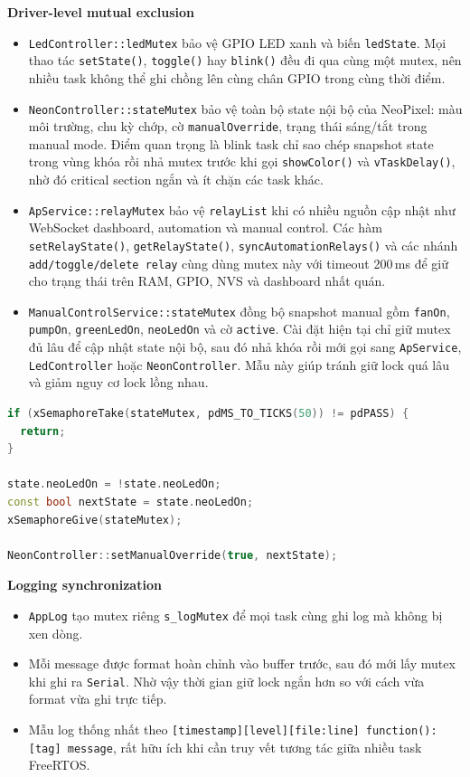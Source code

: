 \textbf{Driver-level mutual exclusion}
\begin{itemize}
    \item \texttt{LedController::ledMutex} bảo vệ GPIO LED xanh và biến \texttt{ledState}. Mọi thao tác \texttt{setState()}, \texttt{toggle()} hay \texttt{blink()} đều đi qua cùng một mutex, nên nhiều task không thể ghi chồng lên cùng chân GPIO trong cùng thời điểm.
    \item \texttt{NeonController::stateMutex} bảo vệ toàn bộ state nội bộ của NeoPixel: màu môi trường, chu kỳ chớp, cờ \texttt{manualOverride}, trạng thái sáng/tắt trong manual mode. Điểm quan trọng là blink task chỉ sao chép snapshot state trong vùng khóa rồi nhả mutex trước khi gọi \texttt{showColor()} và \texttt{vTaskDelay()}, nhờ đó critical section ngắn và ít chặn các task khác.
    \item \texttt{ApService::relayMutex} bảo vệ \texttt{relayList} khi có nhiều nguồn cập nhật như WebSocket dashboard, automation và manual control. Các hàm \texttt{setRelayState()}, \texttt{getRelayState()}, \texttt{syncAutomationRelays()} và các nhánh \texttt{add/toggle/delete relay} cùng dùng mutex này với timeout 200\,ms để giữ cho trạng thái trên RAM, GPIO, NVS và dashboard nhất quán.
    \item \texttt{ManualControlService::stateMutex} đồng bộ snapshot manual gồm \texttt{fanOn}, \texttt{pumpOn}, \texttt{greenLedOn}, \texttt{neoLedOn} và cờ \texttt{active}. Cài đặt hiện tại chỉ giữ mutex đủ lâu để cập nhật state nội bộ, sau đó nhả khóa rồi mới gọi sang \texttt{ApService}, \texttt{LedController} hoặc \texttt{NeonController}. Mẫu này giúp tránh giữ lock quá lâu và giảm nguy cơ lock lồng nhau.
\end{itemize}

\begin{lstlisting}[language=C++,caption={Mau cap nhat state ngan gon roi moi goi driver}]
if (xSemaphoreTake(stateMutex, pdMS_TO_TICKS(50)) != pdPASS) {
  return;
}

state.neoLedOn = !state.neoLedOn;
const bool nextState = state.neoLedOn;
xSemaphoreGive(stateMutex);

NeonController::setManualOverride(true, nextState);
\end{lstlisting}

\textbf{Logging synchronization}
\begin{itemize}
    \item \texttt{AppLog} tạo mutex riêng \texttt{s\_logMutex} để mọi task cùng ghi log mà không bị xen dòng.
    \item Mỗi message được format hoàn chỉnh vào buffer trước, sau đó mới lấy mutex khi ghi ra \texttt{Serial}. Nhờ vậy thời gian giữ lock ngắn hơn so với cách vừa format vừa ghi trực tiếp.
    \item Mẫu log thống nhất theo \texttt{[timestamp][level][file:line] function(): [tag] message}, rất hữu ích khi cần truy vết tương tác giữa nhiều task FreeRTOS.
\end{itemize}

